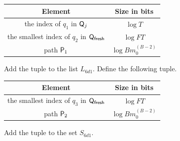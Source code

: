 \begin{enumerate}
\begin{enumerate}
\begin{itemize}
\begin{itemize}
\begin{enumerate}
\begin{center}
\begin{tabular}{|c|c|}
      Element & Size in bits \\ \hline\hline
  
      the index of $q_1$ in $\mathsf{Q}_j$ & $\log T$\\ \hline
  
      the smallest index  of $q_2$ in $\mathsf{Q}_\textsf{fresh}$ & $\log FT$   \\\hline
              
      path $\mathsf{P}_1$ & $ \log Bm_0^{(B-2)}$\\\hline
      
      \end{tabular}
      \end{center}
    Add the tuple to the list $L_{6d1}$. Define the following tuple.
    \begin{center}
      \begin{tabular}{|c|c|}\hline
  
      Element & Size in bits \\ \hline\hline
    
      the smallest index  of $q_3$ in $\mathsf{Q}_\textsf{fresh}$ & $\log FT$   \\\hline
              
      path $\mathsf{P}_2$ & $ \log Bm_0^{(B-2)}$\\\hline
      
      \end{tabular}
      \end{center}
    Add the tuple to the set $S_{6d1}$.
    

\end{enumerate}
\end{itemize}
\end{itemize}
\end{enumerate}
\end{enumerate}
